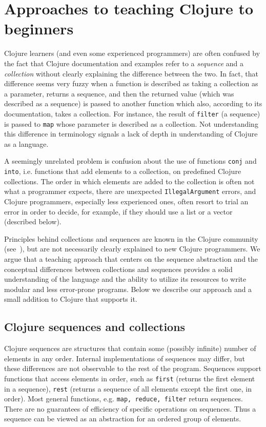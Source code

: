 \documentclass[submission,copyright,creativecommons]{eptcs}
\newcommand{\allcomments}[1]{{#1}}
\newcommand{\todo}[1]{{\bf \color{magenta}{\allcomments{ To-do: {#1}}}}}
\newcommand{\clocode}[1]{{\tt {#1}}}
\begin{document}

\section{Approaches to teaching Clojure to beginners}\label{sec:approaches}
Clojure learners (and even some experienced programmers) are often confused by the fact that Clojure documentation and examples refer to a {\it sequence} and a {\it collection} without clearly explaining the difference between the two. In fact, that difference seems very fuzzy when a function is described as taking a collection as a parameter, returns a sequence, and then the returned value (which was described as a sequence) is passed to another function which also, according to its documentation, takes a collection. For instance, the result of \clocode{filter} (a sequence) is passed to \clocode{map} whose parameter is described as a collection.  Not understanding this difference in terminology signals a lack of depth in understanding of Clojure as a language.

A seemingly unrelated problem is confusion about the use of functions \clocode{conj} and \clocode{into}, i.e. functions that add elements to a collection, on predefined Clojure collections. The order in which elements are added to the collection is often not what a programmer expects, there are unexpected {\tt IllegalArgument} errors, and Clojure programmers, especially less experienced ones, often resort to trial an error in order to decide, for example, if they should use a list or a vector (described below).

Principles behind collections and sequences are known in the Clojure community (see~\cite{JC}), but are not necessarily clearly explained to new Clojure programmers. We argue that a teaching approach that centers on the sequence abstraction and the conceptual differences between collections and sequences provides a solid understanding of the language and the ability to utilize its resources to write modular and less error-prone programs. Below we describe our approach and a small addition to Clojure that supports it. 

\subsection{Clojure sequences and collections}\label{seq-abstr}
Clojure sequences are structures that contain some (possibly infinite) number of elements in any order. Internal implementations of sequences may differ, but these differences are not observable to the rest of the program. Sequences support functions that access elements in order, such as \clocode{first} (returns the first element in a sequence), \clocode{rest} (returns a sequence of all elements except the first one, in order). Most general functions, e.g. \clocode{map, reduce, filter} return sequences. There are no guarantees of efficiency of specific operations on sequences. Thus a sequence can be viewed as an abstraction for an ordered group of elements. 
\end{document}
